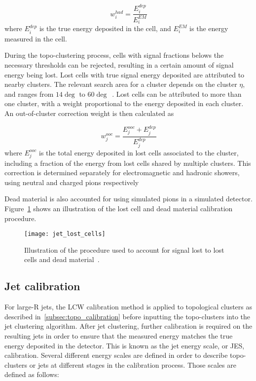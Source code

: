 \begin{equation}\label{eq:had_cal_weight}
    w_{i}^{had} = \frac{E^{dep}_i}{E^{EM}_i}
\end{equation}
where $E^{dep}_i$ is the true energy deposited in the cell, and $E^{EM}_i$ is the energy measured in the cell.

During the topo-clustering process, cells with signal fractions belows the necessary thresholds can be rejected, resulting in a certain amount of signal energy being lost.
Lost cells with true signal energy deposited are attributed to nearby clusters.
The relevant search area for a cluster depends on the cluster $\eta$, and ranges from $14\deg$ to $60\deg$~\cite{jet-topo-cluster}.
Lost cells can be attributed to more than one cluster, with a weight proportional to the energy deposited in each cluster.
An out-of-cluster correction weight is then calculated as

\begin{equation}\label{eq:out_of_cluster}
    w_{j}^{ooc} = \frac{E_j^{ooc}+E^{dep}_j}{E^{dep}_j}
\end{equation}
where $E_j^{ooc}$ is the total energy deposited in lost cells associated to the cluster, including a fraction
of the energy from lost cells shared by multiple clusters.
This correction is determined separately for electromagnetic and hadronic showers, using neutral and charged pions
respectively\cite{jet-topo-cluster}

Dead material is also accounted for using simulated pions in a simulated detector.
Figure~\ref{fig:jet_lost_cells} shows an illustration of the lost cell and dead material calibration procedure.
\begin{figure}[!ht]
    \centering
\texttt{[image: jet\_lost\_cells]}
\caption{Illustration of the procedure used to account for signal lost to lost cells and dead material~\cite{jet-topo-cluster}.}
\label{fig:jet_lost_cells}
\end{figure}

\subsection{Jet calibration}\label{subsec:jet_calibration}
For large-R jets, the LCW calibration method is applied to topological clusters as described in~\ref{subsec:topo_calibration} before inputting the topo-clusters into the jet clustering algorithm.
After jet clustering, further calibration is required on the resulting jets in order to ensure that the measured energy matches the true energy deposited in the detector.
This is known as the jet energy scale, or JES, calibration.
Several different energy scales are defined in order to describe topo-clusters or jets at different stages in the calibration process.
Those scales are defined as follows:

